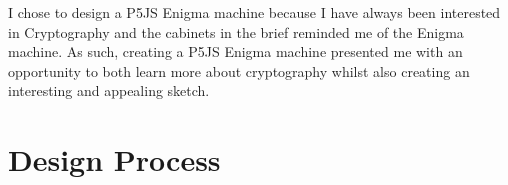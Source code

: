 \documentclass[12pt,a4paper]{article}
\begin{document}
		I chose to design a P5JS Enigma machine because I have always been interested 
		in Cryptography and the cabinets in the brief reminded me of the Enigma machine. 
		As such, creating a P5JS Enigma machine presented me with an opportunity to 
		both learn more about cryptography whilst also creating an interesting and appealing 
		sketch.\\

	\section{Design Process}
\end{document}
